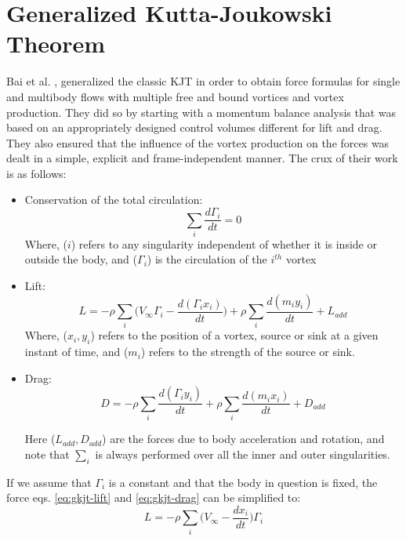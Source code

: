 \section{Generalized Kutta-Joukowski Theorem}
Bai et al. \parencite{Bai2014}, generalized the classic KJT in order to obtain force formulas for single and multibody flows with multiple free and bound vortices and vortex production. They did so by starting with a momentum balance analysis that was based on an appropriately designed control volumes different for lift and drag. They also ensured that the influence of the vortex production on the forces was dealt in a simple, explicit and frame-independent manner.
The crux of their work is as follows:
\begin{itemize}
	\item Conservation of the total circulation:
	\begin{equation}
		\sum_i \frac{d \Gamma_i}{d t} = 0
		\label{eq:gkjt-conservation-of-circulation}
	\end{equation}
	Where, ($i$) refers to any singularity independent of whether it is inside or outside the body, and ($\Gamma_i$) is the circulation of the $i^{th}$ vortex
	\item Lift:
	\begin{equation}
		L = - \rho \sum_i \bigg( V_{\infty} \Gamma_i - \frac{d(\Gamma_i x_i)}{dt} \bigg) + \rho \sum_i \frac{d(m_i y_i)}{dt} + L_{add}
		\label{eq:gkjt-lift}
	\end{equation}
	Where, ($x_i, y_i$) refers to the position of a vortex, source or sink at a given instant of time, and ($m_i$) refers to the strength of the source or sink.
	\item Drag:
	\begin{equation}
		D = - \rho \sum_i \frac{d(\Gamma_i y_i)}{dt} + \rho \sum_i \frac{d(m_i x_i)}{dt} + D_{add}
		\label{eq:gkjt-drag}
	\end{equation}
	
	Here ($L_{add}, D_{add}$) are the forces due to body acceleration and rotation, and note that $\sum_i$ is always performed over all the inner and outer singularities.	
\end{itemize}
If we assume that $\Gamma_i$ is a constant and that the body in question is fixed, the force eqs. \ref{eq:gkjt-lift} and \ref{eq:gkjt-drag} can be simplified to:
\begin{equation}
	L = - \rho \sum_i \bigg( V_{\infty} - \frac{d x_i}{dt} \bigg) \Gamma_i
	\label{eq:gkjt-simple-lift}
\end{equation}
